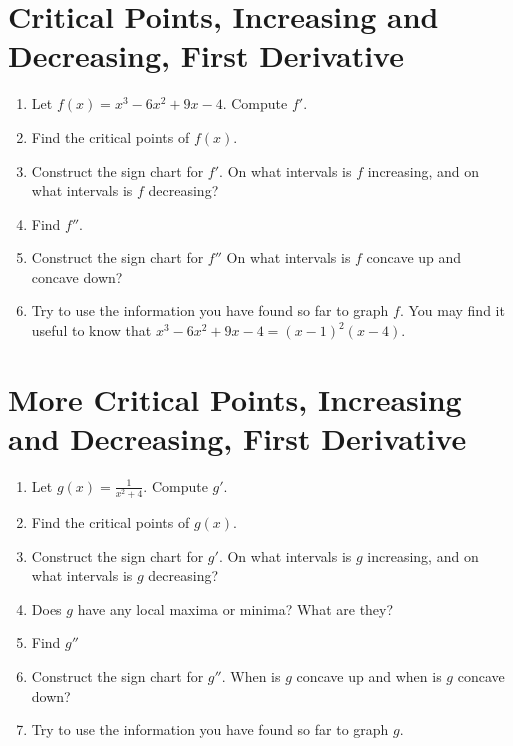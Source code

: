 \documentclass[10pt]{article}
\begin{document}
\newpage

\section{Critical Points, Increasing and Decreasing, First Derivative}

\begin{enumerate}
    \item Let $f(x) = x^3 - 6x^2 + 9x - 4$. Compute $f'$. 
    \item Find the critical points of $f(x)$. 
    \item Construct the sign chart for $f'$. On what intervals is $f$ increasing, and on what intervals is $f$ decreasing? 
    \item Find $f''$. 
    \item Construct the sign chart for $f''$ On what intervals is $f$ concave up and concave down?
    \item Try to use the information you have found so far to graph $f$. You may find it useful to know that $x^3 - 6x^2 + 9x - 4 = (x-1)^2(x-4)$.
\end{enumerate}

\newpage

\section{More Critical Points, Increasing and Decreasing, First Derivative}

\begin{enumerate}
    \item Let $g(x) = \frac{1}{x^2 + 4}$. Compute $g'$. 
    \item Find the critical points of $g(x)$. 
    \item Construct the sign chart for $g'$. On what intervals is $g$ increasing, and on what intervals is $g$ decreasing? 
    \item Does $g$ have any local maxima or minima? What are they?
    \item Find  $g''$
    \item Construct the sign chart for $g''$.  When is $g$ concave up and when is $g$ concave down?
    \item Try to use the information you have found so far to graph $g$. 
\end{enumerate}

\newpage
\end{document}
